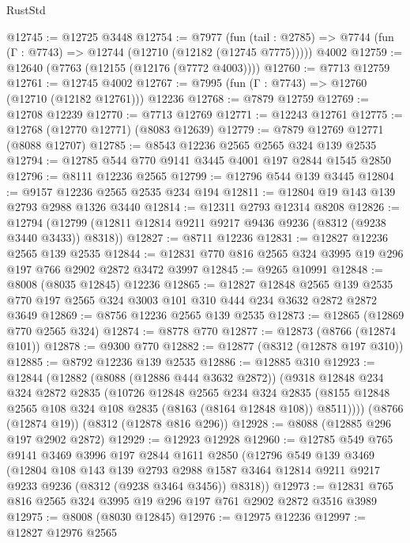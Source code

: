 \begin{lexlean}{RustStd}
\begin{coremodule}
@12745 := @12725 @3448
@12754 := @7977
    (fun (tail : @2785) => @7744 (fun (Γ : @7743) => @12744 (@12710 (@12182 (@12745 @7775)))))
    @4002
@12759 := @12640 (@7763 (@12155 (@12176 (@7772 @4003))))
@12760 := @7713 @12759
@12761 := @12745 @4002
@12767 := @7995 (fun (Γ : @7743) => @12760 (@12710 (@12182 @12761))) @12236
@12768 := @7879 @12759
@12769 := @12708 @12239
@12770 := @7713 @12769
@12771 := @12243 @12761
@12775 := @12768 (@12770 @12771) (@8083 @12639)
@12779 := @7879 @12769 @12771 (@8088 @12707)
@12785 := @8543 @12236 @2565 @2565 @324 @139 @2535
@12794 := @12785 @544 @770 @9141 @3445 @4001 @197 @2844 @1545 @2850
@12796 := @8111 @12236 @2565
@12799 := @12796 @544 @139 @3445
@12804 := @9157 @12236 @2565 @2535 @234 @194
@12811 := @12804 @19 @143 @139 @2793 @2988 @1326 @3440
@12814 := @12311 @2793 @12314 @8208
@12826 := @12794 (@12799 (@12811 @12814 @9211 @9217 @9436 @9236 (@8312 (@9238 @3440 @3433)) @8318))
@12827 := @8711 @12236
@12831 := @12827 @12236 @2565 @139 @2535
@12844 := @12831 @770 @816 @2565 @324 @3995 @19 @296 @197 @766 @2902 @2872 @3472 @3997
@12845 := @9265 @10991
@12848 := @8008 (@8035 @12845) @12236
@12865 := @12827
    @12848
    @2565
    @139
    @2535
    @770
    @197
    @2565
    @324
    @3003
    @101
    @310
    @444
    @234
    @3632
    @2872
    @2872
    @3649
@12869 := @8756 @12236 @2565 @139 @2535
@12873 := @12865 (@12869 @770 @2565 @324)
@12874 := @8778 @770
@12877 := @12873 (@8766 (@12874 @101))
@12878 := @9300 @770
@12882 := @12877 (@8312 (@12878 @197 @310))
@12885 := @8792 @12236 @139 @2535
@12886 := @12885 @310
@12923 := @12844
    (@12882
      (@8088 (@12886 @444 @3632 @2872))
      (@9318
        @12848
        @234
        @324
        @2872
        @2835
        (@10726
          @12848
          @2565
          @234
          @324
          @2835
          (@8155 @12848 @2565 @108 @324 @108 @2835 (@8163 (@8164 @12848 @108)) @8511))))
    (@8766 (@12874 @19))
    (@8312 (@12878 @816 @296))
@12928 := @8088 (@12885 @296 @197 @2902 @2872)
@12929 := @12923 @12928
@12960 := @12785
    @549
    @765
    @9141
    @3469
    @3996
    @197
    @2844
    @1611
    @2850
    (@12796
      @549
      @139
      @3469
      (@12804
        @108
        @143
        @139
        @2793
        @2988
        @1587
        @3464
        @12814
        @9211
        @9217
        @9233
        @9236
        (@8312 (@9238 @3464 @3456))
        @8318))
@12973 := @12831 @765 @816 @2565 @324 @3995 @19 @296 @197 @761 @2902 @2872 @3516 @3989
@12975 := @8008 (@8030 @12845)
@12976 := @12975 @12236
@12997 := @12827
    @12976
    @2565

\end{coremodule}
\end{lexlean}
